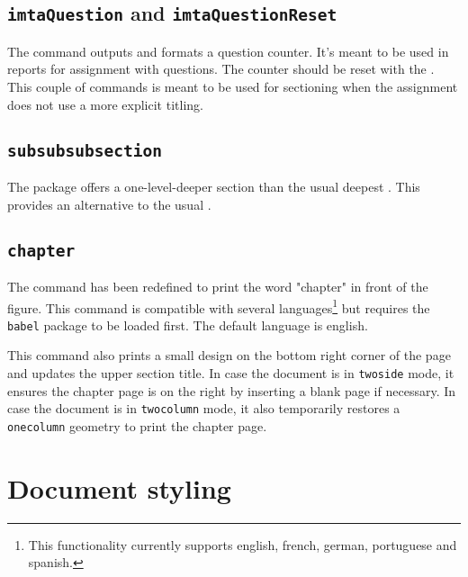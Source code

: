 \documentclass{report}
\begin{document}
\subsection{\texttt{imtaQuestion} and \texttt{imtaQuestionReset}}
The  command outputs and formats a question counter.
It's meant to be used in reports for assignment with questions.
The counter should be reset with the .
This couple of commands is meant to be used for sectioning when the assignment does not use a more explicit titling.

\subsection{\texttt{subsubsubsection}}
The  package offers a one-level-deeper section than the usual deepest .
This provides an alternative to the usual .

\subsection{\texttt{chapter}}
The  command has been redefined to print the word "chapter" in front of the figure. This command is compatible with several languages\footnote{This functionality currently supports english, french, german, portuguese and spanish.} but requires the \texttt{babel} package to be loaded first. The default language is english.

This command also prints a small design on the bottom right corner of the page and updates the upper section title. In case the document is in \texttt{twoside} mode, it ensures the chapter page is on the right by inserting a blank page if necessary. In case the document is in \texttt{twocolumn} mode, it also temporarily restores a \texttt{onecolumn} geometry to print the chapter page.


\section{Document styling}
\end{document}
